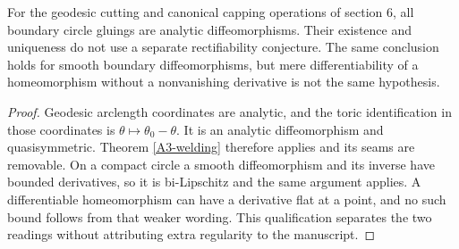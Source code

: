 \begin{corollary}\label{A3-L5}
For the geodesic cutting and canonical capping operations of section 6, all boundary circle gluings are analytic diffeomorphisms. Their existence and uniqueness do not use a separate rectifiability conjecture. The same conclusion holds for smooth boundary diffeomorphisms, but mere differentiability of a homeomorphism without a nonvanishing derivative is not the same hypothesis.
\end{corollary}
\begin{proof}
Geodesic arclength coordinates are analytic, and the toric identification in those coordinates is $\theta\mapsto\theta_0-\theta$. It is an analytic diffeomorphism and quasisymmetric. Theorem \ref{A3-welding} therefore applies and its seams are removable. On a compact circle a smooth diffeomorphism and its inverse have bounded derivatives, so it is bi-Lipschitz and the same argument applies. A differentiable homeomorphism can have a derivative flat at a point, and no such bound follows from that weaker wording. This qualification separates the two readings without attributing extra regularity to the manuscript.
\end{proof}
